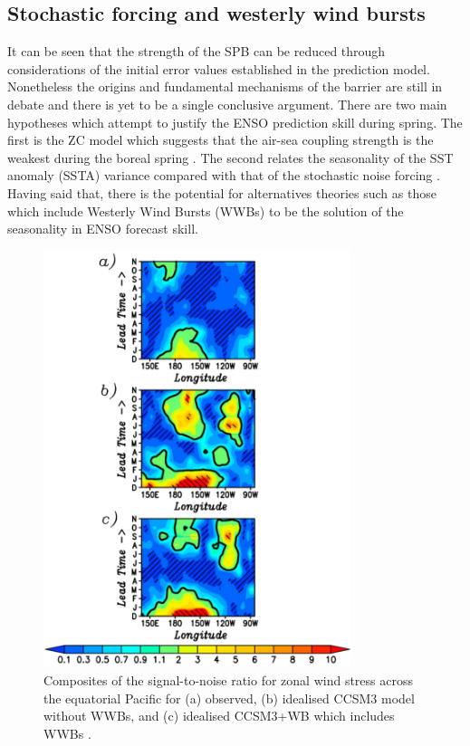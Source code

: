 \documentclass[12pt, onecolumn]{revtex4}    %
\begin{document}

\subsection{Stochastic forcing and westerly wind bursts}

It can be seen that the strength of the SPB can be reduced through considerations of the initial error values established in the prediction model. Nonetheless the origins and fundamental mechanisms of the barrier are still in debate and there is yet to be a single conclusive argument. There are two main hypotheses which attempt to justify the ENSO prediction skill during spring. The first is the ZC model which suggests that the air-sea coupling strength is the weakest during the boreal spring \citep{Zebiak:1987aa}. The second relates the seasonality of the SST anomaly (SSTA) variance compared with that of the stochastic noise forcing \citep{webster1992monsoon, xue1994prediction}. Having said that, there is the potential for alternatives theories such as those which include Westerly Wind Bursts (WWBs) to be the solution of the seasonality in ENSO forecast skill. \\

\begin{figure}
\includegraphics[width=0.8\textwidth]{data/wwbs}
\caption[WWBs]{Composites of the signal-to-noise ratio for zonal wind stress across the equatorial Pacific for (a) observed, (b) idealised CCSM3 model without WWBs, and (c) idealised CCSM3+WB which includes WWBs \citep{lopez2014wwbs}.}
\label{fig:wwbs}
\end{figure}
\end{document}
